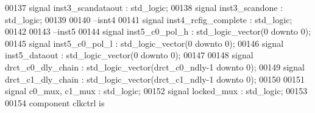 \begin{DoxyCode}
00137 \textcolor{keywordflow}{signal} \textcolor{vhdlchar}{inst3_scandataout}         \textcolor{vhdlchar}{:} \textcolor{comment}{std\_logic};
00138 \textcolor{keywordflow}{signal} \textcolor{vhdlchar}{inst3_scandone}            \textcolor{vhdlchar}{:} \textcolor{comment}{std\_logic};
00139 
00140 \textcolor{keyword}{--isnt4}
00141 \textcolor{keywordflow}{signal} \textcolor{vhdlchar}{inst4_rcfig_complete}      \textcolor{vhdlchar}{:} \textcolor{comment}{std\_logic};
00142 
00143 \textcolor{keyword}{--inst5}
00144 \textcolor{keywordflow}{signal} \textcolor{vhdlchar}{inst5_c0_pol_h}            \textcolor{vhdlchar}{:} \textcolor{comment}{std\_logic\_vector}\textcolor{vhdlchar}{(}\textcolor{vhdllogic}{}\textcolor{vhdllogic}{0} \textcolor{keywordflow}{downto} \textcolor{vhdllogic}{}\textcolor{vhdllogic}{0}\textcolor{vhdlchar}{)};
00145 \textcolor{keywordflow}{signal} \textcolor{vhdlchar}{inst5_c0_pol_l}            \textcolor{vhdlchar}{:} \textcolor{comment}{std\_logic\_vector}\textcolor{vhdlchar}{(}\textcolor{vhdllogic}{}\textcolor{vhdllogic}{0} \textcolor{keywordflow}{downto} \textcolor{vhdllogic}{}\textcolor{vhdllogic}{0}\textcolor{vhdlchar}{)};
00146 \textcolor{keywordflow}{signal} \textcolor{vhdlchar}{inst5_dataout}             \textcolor{vhdlchar}{:} \textcolor{comment}{std\_logic\_vector}\textcolor{vhdlchar}{(}\textcolor{vhdllogic}{}\textcolor{vhdllogic}{0} \textcolor{keywordflow}{downto} \textcolor{vhdllogic}{}\textcolor{vhdllogic}{0}\textcolor{vhdlchar}{)};
00147 
00148 \textcolor{keywordflow}{signal} \textcolor{vhdlchar}{drct_c0_dly_chain}         \textcolor{vhdlchar}{:} \textcolor{comment}{std\_logic\_vector}\textcolor{vhdlchar}{(}\textcolor{vhdlchar}{drct_c0_ndly}\textcolor{vhdlchar}{-}\textcolor{vhdllogic}{}\textcolor{vhdllogic}{1} \textcolor{keywordflow}{downto} \textcolor{vhdllogic}{}\textcolor{vhdllogic}{0}\textcolor{vhdlchar}{)};
00149 \textcolor{keywordflow}{signal} \textcolor{vhdlchar}{drct_c1_dly_chain}         \textcolor{vhdlchar}{:} \textcolor{comment}{std\_logic\_vector}\textcolor{vhdlchar}{(}\textcolor{vhdlchar}{drct_c1_ndly}\textcolor{vhdlchar}{-}\textcolor{vhdllogic}{}\textcolor{vhdllogic}{1} \textcolor{keywordflow}{downto} \textcolor{vhdllogic}{}\textcolor{vhdllogic}{0}\textcolor{vhdlchar}{)};
00150 
00151 \textcolor{keywordflow}{signal} \textcolor{vhdlchar}{c0_mux}\textcolor{vhdlchar}{,} \textcolor{vhdlchar}{c1_mux}            \textcolor{vhdlchar}{:} \textcolor{comment}{std\_logic};
00152 \textcolor{keywordflow}{signal} \textcolor{vhdlchar}{locked_mux}                \textcolor{vhdlchar}{:} \textcolor{comment}{std\_logic};
00153 
00154 \textcolor{keywordflow}{component} clkctrl \textcolor{keywordflow}{is}

\end{DoxyCode}
